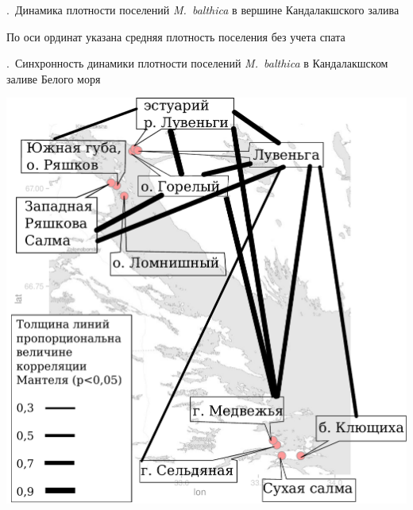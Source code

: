 \documentclass[aspectratio=169, xcolor=table]{beamer}
\begin{document}
\begin{frame}{\insertpagenumber.\ Динамика плотности поселений {\it M.~balthica} в вершине Кандалакшского залива}
\begin{minipage}[t]{.49\linewidth}
\begin{center}
		\end{center}
	\end{minipage}
{\tiny По оси ординат указана средняя плотность поселения без учета спата}
\end{frame}

\begin{frame}{\insertpagenumber.\ Синхронность динамики плотности поселений {\it M.~balthica} в Кандалакшском заливе Белого моря}
		\begin{center}
			\includegraphics[height=.8\textheight]{mantel_map.pdf}
		\end{center}
\end{frame}
\end{document}

